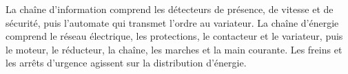 \begin{corrigebox}
La chaîne d'information comprend les détecteurs de présence, de vitesse et de sécurité, puis l'automate qui transmet l'ordre au variateur. La chaîne d'énergie comprend le réseau électrique, les protections, le contacteur et le variateur, puis le moteur, le réducteur, la chaîne, les marches et la main courante. Les freins et les arrêts d'urgence agissent sur la distribution d'énergie.
\end{corrigebox}
